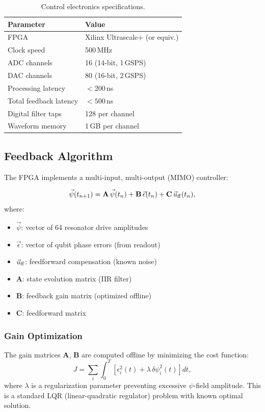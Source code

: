\documentclass[11pt,letterpaper]{article}
\begin{document}
\begin{table}[H]
\caption{Control electronics specifications.}
\begin{tabular}{ll}
\toprule
\textbf{Parameter} & \textbf{Value} \\
\midrule
FPGA & Xilinx Ultrascale+ (or equiv.) \\
Clock speed & 500\,MHz \\
ADC channels & 16 (14-bit, 1\,GSPS) \\
DAC channels & 80 (16-bit, 2\,GSPS) \\
Processing latency & $<200$\,ns \\
Total feedback latency & $<500$\,ns \\
Digital filter taps & 128 per channel \\
Waveform memory & 1\,GB per channel \\
\bottomrule
\end{tabular}
\end{table}

\subsection{Feedback Algorithm}

The FPGA implements a multi-input, multi-output (MIMO) controller:

\begin{equation}
\vec{\psi}(t_{n+1}) = \mathbf{A}\,\vec{\psi}(t_n)
+ \mathbf{B}\,\vec{\epsilon}(t_n) + \mathbf{C}\,\vec{u}_{\rm ff}(t_n),
\end{equation}
where:
\begin{itemize}
\item $\vec{\psi}$: vector of 64 resonator drive amplitudes
\item $\vec{\epsilon}$: vector of qubit phase errors (from readout)
\item $\vec{u}_{\rm ff}$: feedforward compensation (known noise)
\item $\mathbf{A}$: state evolution matrix (IIR filter)
\item $\mathbf{B}$: feedback gain matrix (optimized offline)
\item $\mathbf{C}$: feedforward matrix
\end{itemize}

\subsubsection{Gain Optimization}

The gain matrices $\mathbf{A}$, $\mathbf{B}$ are computed offline by
minimizing the cost function:
\begin{equation}
J = \sum_i \int_0^T \left[\epsilon_i^2(t)
+ \lambda\,\delta\psi_i^2(t)\right] dt,
\end{equation}
where $\lambda$ is a regularization parameter preventing excessive
$\psi$-field amplitude. This is a standard LQR (linear-quadratic
regulator) problem with known optimal solution.
\end{document}

